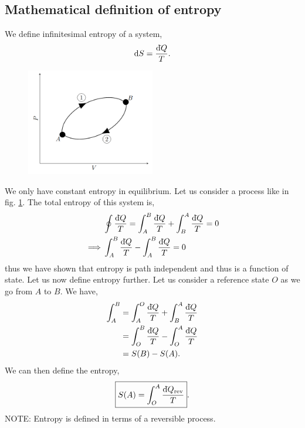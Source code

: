 \documentclass{book}
\newcommand{\dbar}{\mathrm{d}\hspace*{-0.08em}\bar{}\hspace*{0.1em}}
\begin{document}
\subsection{Mathematical definition of entropy}
We define infinitesimal entropy of a system,
\begin{equation}
	\dd{S} = \frac{\dbar Q}{T}.
\end{equation}
\begin{figure}
	\centering
	\includegraphics[width=0.5\textwidth]{cycle.png}
	\caption{}
	\label{fig:cycle}
\end{figure}
We only have constant entropy in equilibrium. Let us consider a process like in fig. \ref{fig:cycle}. The total entropy of this system is,
\begin{equation}
	\begin{split}
	&\oint\frac{\dbar Q}{T} = \int_A^B \frac{\dbar Q}{T} + \int_B^A \frac{\dbar Q}{T} = 0 \\
	\implies & \int_A^B \frac{\dbar Q}{T} - \int_A^B \frac{\dbar Q}{T} = 0
	\end{split}
\end{equation}
thus we have shown that entropy is path independent and thus is a function of state. Let us now define entropy further. Let us consider a reference state $O$ as we go from $A$ to $B$. We have,
\begin{equation}
	\begin{split}
		\int_A^B &= \int_A^O \frac{\dbar Q}{T} + \int_B^A \frac{\dbar Q}{T} \\
		& = \int_O^B \frac{\dbar Q}{T} - \int_O^A \frac{\dbar Q}{T}\\
		& = S(B) - S(A).
	\end{split}
\end{equation}
We can then define the entropy,
\begin{equation}
	\boxed{S(A) = \int_O^A \frac{\dbar Q_{\text{rev}}}{T}}.
\end{equation}
NOTE: Entropy is defined in terms of a reversible process.
\end{document}
